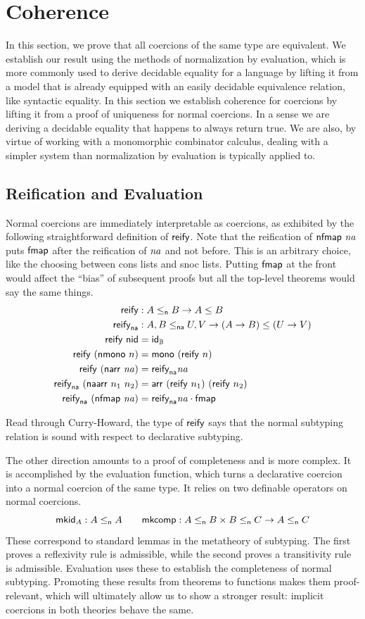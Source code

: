 \documentclass[acmsmall,screen]{acmart}
\begin{document}
\section{Coherence}
In this section, we prove that all coercions of the same type are equivalent. We
establish our result using the methods of normalization by evaluation, which is
more commonly used to derive decidable equality for a language by lifting it
from a model that is already equipped with an easily decidable equivalence
relation, like syntactic equality. In this section we establish coherence for
coercions by lifting it from a proof of uniqueness for normal coercions. In a
sense we are deriving a decidable equality that happens to always return true.
We are also, by virtue of working with a monomorphic combinator calculus,
dealing with a simpler system than normalization by evaluation is typically
applied to.

\subsection{Reification and Evaluation}
Normal coercions are immediately interpretable as coercions, as exhibited by the
following straightforward definition of \(\mathsf{reify}\).
Note that the reification of \(\mathsf{nfmap}\ \mathit{na}\) puts \(\mathsf{fmap}\) after the
reification of \(\mathit{na}\) and not before. This is an arbitrary choice, like the
choosing between cons lists and snoc lists. Putting \(\mathsf{fmap}\) at the front
would affect the ``bias'' of subsequent proofs but all the top-level theorems
would say the same things.
\begin{align*}
  \reify &: A \nsubty B \to A \subty B \\
  \reifyna &: A, B \nasubty U, V \to (A \to B) \subty (U \to V) \\
  \reify\ \nid &= \cid{\tbool} \\
  \reify\ (\nmono\ n) &= \cmono\ (\reify\ n) \\
  \reify\ (\narr\ \na) &= \reifyna \na \\
  \reifyna\ (\naarr\ n_1\ n_2) &= \carr\ (\reify\ n_1)\ (\reify\ n_2) \\
  \reifyna\ (\nfmap{\na}) &= \ccomp{\reifyna \na}{\cfmap}
\end{align*}

Read through Curry-Howard, the type of \(\mathsf{reify}\) says that the normal subtyping
relation is sound with respect to declarative subtyping.

The other direction amounts to a proof of completeness and is more complex.  It
is accomplished by the evaluation function, which turns a declarative coercion
into a normal coercion of the same type. It relies on two definable operators on
normal coercions.
\[
  \mathsf{mkid}_{A} : A \leq_{\mathsf{n}} A \qquad \mathsf{mkcomp} : A \leq_{\mathsf{n}} B \times B \leq_{\mathsf{n}} C \to A \leq_{\mathsf{n}} C
\]
These correspond to standard lemmas in the metatheory of subtyping.
The first proves a reflexivity rule is admissible,
while the second proves a transitivity rule is admissible.
Evaluation uses these to establish the completeness of normal subtyping.
Promoting these results from theorems to functions makes them proof-relevant,
which will ultimately allow us to show a stronger result: implicit coercions in
both theories behave the same.
\end{document}
